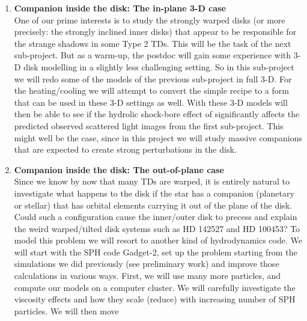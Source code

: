 \documentclass[10pt,fleqn,twoside,a4paper]{article}
\begin{document}
\begin{enumerate}
{  which we wish to avoid, to save time for the following sub-projects.}
\item {\bf Companion inside the disk: The in-plane 3-D case}\label{subproj-inplane-3d}\\
  One of our prime interests is to study the strongly warped disks (or more
  precisely: the strongly inclined inner disks) that appear to be
  responsible for the strange shadows in some Type 2 TDs. This will be
  the task of the next sub-project. But as a warm-up, the postdoc will gain
  some experience with 3-D disk modelling in a slightly less challenging
  setting.  So in this sub-project we will redo some of the models of the
  previous sub-project in full 3-D. For the heating/cooling we will attempt
  to convert the simple recipe to a form that can be used in these 3-D
  settings as well.  With these 3-D models will then be able to see if the
  hydrolic shock-bore effect of \citep{2006ApJ...641..534B} \citep[and
  discussed in the context of observability of spiral waves
  in][]{2015ApJ...809L...5D} significantly affects the predicted observed
  scattered light images from the first sub-project. This might well be the
  case, since in this project we will study massive companions that are
  expected to create strong perturbations in the disk.  
\item {\bf Companion inside the disk: The out-of-plane case}\label{subproj-inclined-3d}\\
  Since we know by now that many TDs are warped, it is entirely natural to
  investigate what happens to the disk if the star has a companion
  (planetary or stellar) that has orbital elements carrying it out of the
  plane of the disk. Could such a configuration cause the inner/outer disk
  to precess and explain the weird warped/tilted disk systems such as HD
  142527 and HD 100453? To model this problem we will resort to another kind
  of hydrodynamics code. We will start with the SPH code Gadget-2, set up
  the problem starting from the simulations we did previously (see
  preliminary work) and improve those calculations in various ways.  First,
  we will use many more particles, and compute our models on a computer
  cluster. We will carefully investigate the viscosity effects and how they
  scale (reduce) with increasing number of SPH particles.  We will then move

\end{enumerate}
\end{document}
